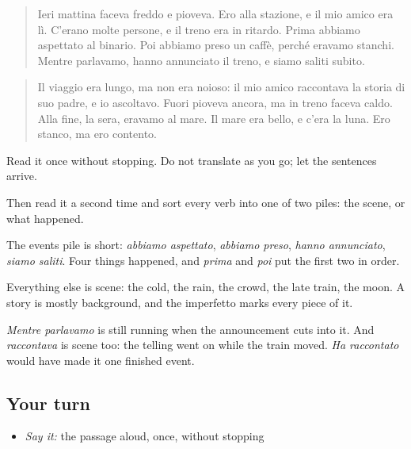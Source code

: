\begin{tcolorbox}[breakable,skin=enhanced,colback=orange!6,colframe=orange!45!black,boxrule=0.5pt,arc=1mm,left=6pt,right=6pt,top=4pt,bottom=4pt,fonttitle=\bfseries,title={Read this}]
\begin{quote}
Ieri mattina faceva freddo e pioveva. Ero alla stazione, e il mio amico era lì. C'erano molte persone, e il treno era in ritardo. Prima abbiamo aspettato al binario. Poi abbiamo preso un caffè, perché eravamo stanchi. Mentre parlavamo, hanno annunciato il treno, e siamo saliti subito.
\end{quote}

\begin{quote}
Il viaggio era lungo, ma non era noioso: il mio amico raccontava la storia di suo padre, e io ascoltavo. Fuori pioveva ancora, ma in treno faceva caldo. Alla fine, la sera, eravamo al mare. Il mare era bello, e c'era la luna. Ero stanco, ma ero contento.
\end{quote}

Read it once without stopping. Do not translate as you go; let the sentences arrive.

Then read it a second time and sort every verb into one of two piles: the scene, or what happened.
\end{tcolorbox}

\begin{culture}
The events pile is short: \emph{abbiamo aspettato}, \emph{abbiamo preso}, \emph{hanno annunciato}, \emph{siamo saliti}. Four things happened, and \emph{prima} and \emph{poi} put the first two in order.

Everything else is scene: the cold, the rain, the crowd, the late train, the moon. A story is mostly background, and the imperfetto marks every piece of it.

\emph{Mentre parlavamo} is still running when the announcement cuts into it. And \emph{raccontava} is scene too: the telling went on while the train moved. \emph{Ha raccontato} would have made it one finished event.
\end{culture}

\subsection*{Your turn}
\begin{itemize}
\raggedright
  \item \emph{Say it:} the passage aloud, once, without stopping
\end{itemize}

